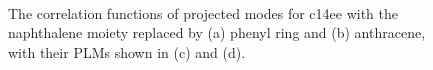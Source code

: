 \begin{figure}[t]
\\
\caption{The correlation functions of projected modes for c14ee with the naphthalene moiety
replaced by (a) phenyl ring and (b) anthracene, with their PLMs shown in (c) and (d). \label{benz}}
\end{figure}

